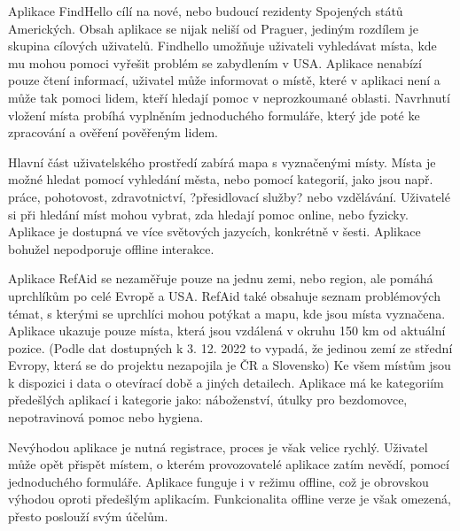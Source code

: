 








Aplikace FindHello cílí na nové, nebo budoucí rezidenty Spojených států Amerických. Obsah aplikace se nijak neliší od Praguer, jediným rozdílem je skupina cílových uživatelů. Findhello umožňuje uživateli vyhledávat místa, kde mu mohou pomoci vyřešit problém se zabydlením v USA. Aplikace nenabízí pouze čtení informací, uživatel může informovat o místě, které v aplikaci není a může tak pomoci lidem, kteří hledají pomoc v neprozkoumané oblasti. Navrhnutí vložení místa probíhá vyplněním jednoduchého formuláře, který jde poté ke zpracování a ověření pověřeným lidem.
\par
Hlavní část uživatelského prostředí zabírá mapa s vyznačenými místy. Místa je možné hledat pomocí vyhledání města, nebo pomocí kategorií, jako jsou např. práce, pohotovost, zdravotnictví, ?přesidlovací služby? nebo vzdělávání. Uživatelé si při hledání míst mohou vybrat, zda hledají pomoc online, nebo fyzicky. Aplikace je dostupná ve více světových jazycích, konkrétně v šesti. Aplikace bohužel nepodporuje offline interakce.



Aplikace RefAid se nezaměřuje pouze na jednu zemi, nebo region, ale pomáhá uprchlíkům po celé Evropě a USA. RefAid také obsahuje seznam problémových témat, s kterými se uprchlíci mohou potýkat a mapu, kde jsou místa vyznačena. Aplikace ukazuje pouze místa, která jsou vzdálená v okruhu 150 km od aktuální pozice. (Podle dat dostupných k 3. 12. 2022 to vypadá, že jedinou zemí ze střední Evropy, která se do projektu nezapojila je ČR a Slovensko) Ke všem místům jsou k dispozici i data o otevírací době a jiných detailech. Aplikace má ke kategoriím předešlých aplikací i kategorie jako: náboženství, útulky pro bezdomovce, nepotravinová pomoc nebo hygiena.
\par
Nevýhodou aplikace je nutná registrace, proces je však velice rychlý. Uživatel může opět přispět místem, o kterém provozovatelé aplikace zatím nevědí, pomocí jednoduchého formuláře. Aplikace funguje i v režimu offline, což je obrovskou výhodou oproti předešlým aplikacím. Funkcionalita offline verze je však omezená, přesto poslouží svým účelům.


